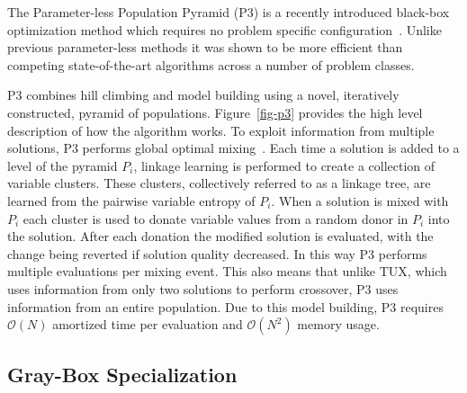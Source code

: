\documentclass{sig-alternate}
\newcommand{\BigO}[1]{$\mathcal{O}{(#1)}$}
\begin{document}
The Parameter-less Population Pyramid (P3) is a recently introduced
black-box optimization method which requires no problem specific configuration~\cite{goldman:2014:p3,goldman:2015:fastp3}.
Unlike previous parameter-less methods it was shown to be more efficient than
competing state-of-the-art algorithms across a number of problem classes.

P3 combines hill climbing and model building using a novel, iteratively constructed, pyramid
of populations. Figure~\ref{fig-p3} provides the high level description of how the algorithm
works. To exploit information from multiple solutions, P3 performs global optimal mixing~\cite{thierens:2011:gomea}.
Each time a solution is added to a level of the pyramid $P_i$, linkage learning is performed to
create a collection of variable clusters. These clusters, collectively referred to as a linkage tree,
are learned from the pairwise variable entropy of $P_i$. When a solution is mixed with $P_i$
each cluster is used to donate variable values from a random donor in $P_i$ into the solution.
After each donation the modified solution is evaluated,
with the change being reverted if solution quality decreased. In this way P3 performs
multiple evaluations per mixing event. This also means that unlike TUX, which uses information from only two
solutions to perform crossover, P3 uses information from an entire population.
Due to this model building, P3 requires \BigO{N} amortized time per evaluation and \BigO{N^2}
memory usage.

\subsection{Gray-Box Specialization}
\begin{comment}
\begin{figure}
  \begin{algorithmic}[1]
  \Procedure{SubfunctionTree}{}
    \State $clusters \leftarrow [\{0\}, \{1\}, \{2\}, \dots, \{N-1\}]$
    \State $cluster\_number \leftarrow [0 .. N-1]$
    \ForAll{$subfunction \in shuffled(subfunctions)$}
      \State $to\_merge \leftarrow \emptyset$
      \ForAll{$b \in subfunction$}
        \State $to\_merge \leftarrow to\_merge \cup \{cluster\_number[b]\}$
      \EndFor
      \If{$|to\_merge| > 1$}
        \State $new\_cluster \leftarrow \emptyset$
        \ForAll{$i \in to\_merge$}
          \State $new\_cluster \leftarrow new\_cluster \cup clusters[i]$
        \EndFor
        \ForAll{$b \in new\_cluster$}
          \State $cluster\_number[b] \leftarrow |clusters|$
        \EndFor
        \State $clusters \leftarrow clusters + new\_cluster$
      \EndIf
    \EndFor
    \State Remove first $N~clusters$
    \State Remove any cluster containing all variables
  \EndProcedure
\end{algorithmic}
  \caption{Algorithm used to convert a list of subfunctions into linkage tree clusters.}
  \label{fig-sfx-tree}
\end{figure}
\end{comment}
\end{document}
